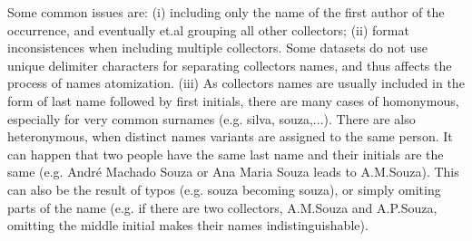 














Some common issues are: (i) including only the name of the first author of the occurrence, and eventually et.al grouping all other collectors;
(ii) format inconsistences when including multiple collectors. Some datasets do not use unique delimiter characters for separating collectors names, and thus affects the process of names atomization.
(iii) As collectors names are usually included in the form of last name followed by first initials, there are many cases of homonymous, especially for very common surnames (e.g. silva, souza,...).
There are also heteronymous, when distinct names variants are assigned to the same person. It can happen that two people have the same last name and their initials are the same (e.g. André Machado Souza or Ana Maria Souza leads to A.M.Souza).
This can also be the result of typos (e.g. souza becoming souza), or simply omiting parts of the name (e.g. if there are two collectors, A.M.Souza and A.P.Souza, omitting the middle initial makes their names indistinguishable).


